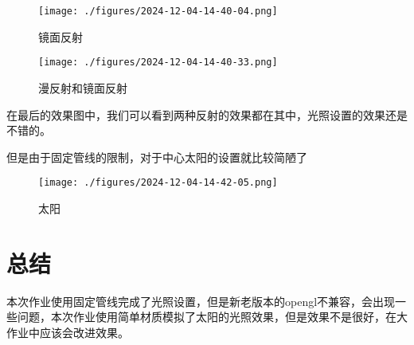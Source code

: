 \documentclass[12pt,hyperref,a4paper,UTF8]{ctexart}
\begin{document}
\begin{figure}[H]
    \centering
    \texttt{[image: ./figures/2024-12-04-14-40-04.png]}
    \caption{镜面反射}
\end{figure}

\begin{figure}[H]
    \centering
    \texttt{[image: ./figures/2024-12-04-14-40-33.png]}
    \caption{漫反射和镜面反射}
\end{figure}

在最后的效果图中，我们可以看到两种反射的效果都在其中，光照设置的效果还是不错的。

但是由于固定管线的限制，对于中心太阳的设置就比较简陋了

\begin{figure}[H]
    \centering
    \texttt{[image: ./figures/2024-12-04-14-42-05.png]}
    \caption{太阳}
\end{figure}

\section{总结}

本次作业使用固定管线完成了光照设置，但是新老版本的opengl不兼容，会出现一些问题，本次作业使用简单材质模拟了太阳的光照效果，但是效果不是很好，在大作业中应该会改进效果。
\end{document}
